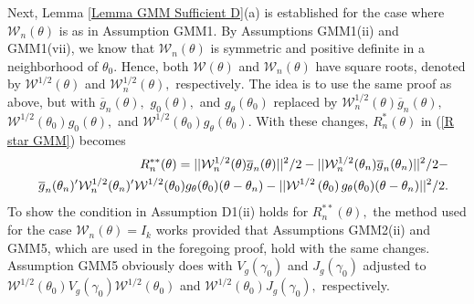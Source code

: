 \documentclass[12pt,thmsb,titlepage,final,oneside,letterpaper]{article}
\begin{document}
Next, Lemma \ref{Lemma GMM Sufficient D}(a) is established for the case
where $\mathcal{W}_{n}(\theta )$ is as in Assumption GMM1. By Assumptions
GMM1(ii) and GMM1(vii), we know that $\mathcal{W}_{n}(\theta )$ is symmetric
and positive definite in a neighborhood of $\theta _{0}.$ Hence, both $%
\mathcal{W}(\theta )$ and $\mathcal{W}_{n}(\theta )$ have square roots,
denoted by $\mathcal{W}^{1/2}(\theta )$ and $\mathcal{W}_{n}^{1/2}(\theta ),$
respectively$.$ The idea is to use the same proof as above, but with $%
\overline{g}_{n}(\theta ),$ $g_{0}(\theta ),$ and $g_{\theta }(\theta _{0})$
replaced by $\mathcal{W}_{n}^{1/2}(\theta )\overline{g}_{n}(\theta ),$ $%
\mathcal{W}^{1/2}(\theta _{0})g_{0}(\theta ),$ and $\mathcal{W}^{1/2}(\theta
_{0})g_{\theta }(\theta _{0}).$ With these changes, $R_{n}^{\ast }(\theta )$
in (\ref{R star GMM}) becomes%
\begin{eqnarray}
&&R_{n}^{\ast \ast }(\theta )\overset{}{=}||\mathcal{W}_{n}^{1/2}(\theta )%
\overline{g}_{n}(\theta )||^{2}/2-||\mathcal{W}_{n}^{1/2}(\theta _{n})%
\overline{g}_{n}(\theta _{n})||^{2}/2-  \label{R star star replace} \\
&&\overline{g}_{n}(\theta _{n})^{\prime }\mathcal{W}_{n}^{1/2}(\theta
_{n})^{\prime }\mathcal{W}^{1/2}(\theta _{0})g_{\theta }(\theta _{0})(\theta
-\theta _{n})-||\mathcal{W}^{1/2}\left( \theta _{0}\right) g_{\theta
}(\theta _{0})(\theta -\theta _{n})||^{2}/2.  \notag
\end{eqnarray}%
To show the condition in Assumption D1(ii) holds for $R_{n}^{\ast \ast
}\left( \theta \right) ,$ the method used for the case $\mathcal{W}%
_{n}\left( \theta \right) =I_{k}$ works provided that Assumptions GMM2(ii)
and GMM5, which are used in the foregoing proof, hold with the same changes.
Assumption GMM5 obviously does with $V_{g}\left( \gamma _{0}\right) $ and $%
J_{g}\left( \gamma _{0}\right) $ adjusted to $\mathcal{W}^{1/2}\left( \theta
_{0}\right) V_{g}\left( \gamma _{0}\right) \mathcal{W}^{1/2}\left( \theta
_{0}\right) $ and $\mathcal{W}^{1/2}\left( \theta _{0}\right) J_{g}\left(
\gamma _{0}\right) ,$ respectively.
\end{document}
